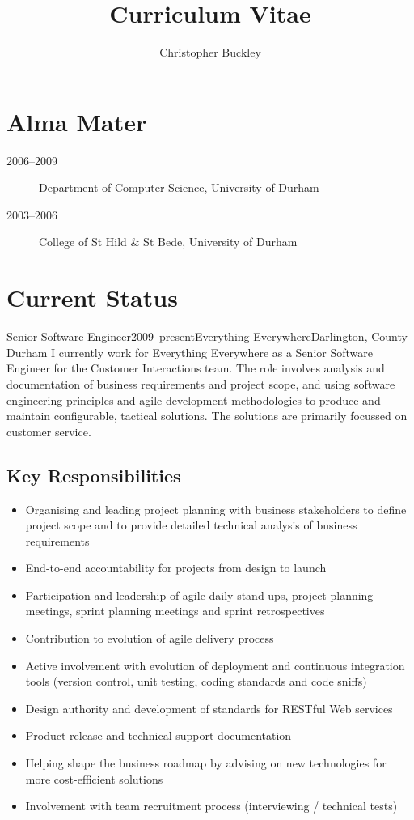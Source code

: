 \documentclass{cv}
\title{Curriculum Vitae}
\author{Christopher Buckley}
\begin{document}
\section{Alma Mater}

\begin{description}
\item[2006--2009] Department of Computer Science, University of Durham
\item[2003--2006] College of St Hild \& St Bede, University of Durham
\end{description}

\section{Current Status}

\begin{experience}{Senior Software Engineer}{2009--present}{Everything Everywhere}{Darlington, County Durham}
I currently work for Everything Everywhere as a Senior Software Engineer for the Customer Interactions team. The role involves analysis and documentation of business requirements and project scope, and using software engineering principles and agile development methodologies to produce and maintain configurable, tactical solutions. The solutions are primarily focussed on customer service.

\subsection*{Key Responsibilities}

\begin{itemize}
\item Organising and leading project planning with business stakeholders to define project scope and to provide detailed technical analysis of business requirements
\item End-to-end accountability for projects from design to launch
\item Participation and leadership of agile daily stand-ups, project planning meetings, sprint planning meetings and sprint retrospectives
\item Contribution to evolution of agile delivery process
\item Active involvement with evolution of deployment and continuous integration tools (version control, unit testing, coding standards and code sniffs)
\item Design authority and development of standards for RESTful Web services
\item Product release and technical support documentation
\item Helping shape the business roadmap by advising on new technologies for more cost-efficient solutions
\item Involvement with team recruitment process (interviewing / technical tests)
\end{itemize}
\end{experience}
\end{document}
